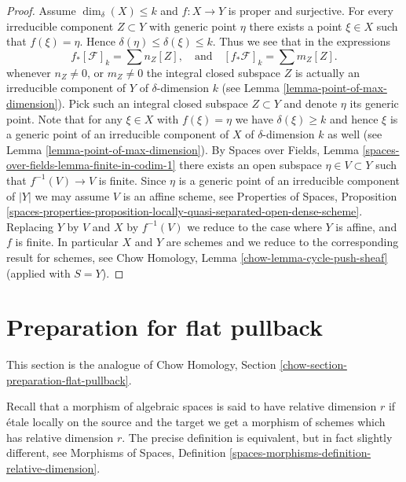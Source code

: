 \begin{proof}
\medskip\noindent
Assume $\dim_\delta(X) \leq k$ and $f : X \to Y$ is proper and surjective.
For every irreducible component $Z \subset Y$
with generic point $\eta$ there exists a point $\xi \in X$ such
that $f(\xi) = \eta$. Hence $\delta(\eta) \leq \delta(\xi) \leq k$.
Thus we see that in the expressions
$$
f_*[\mathcal{F}]_k = \sum n_Z[Z],
\quad
\text{and}
\quad
[f_*\mathcal{F}]_k = \sum m_Z[Z].
$$
whenever $n_Z \not = 0$, or $m_Z \not = 0$ the integral closed
subspace $Z$ is actually an irreducible component of $Y$ of
$\delta$-dimension $k$ (see Lemma \ref{lemma-point-of-max-dimension}).
Pick such an integral closed subspace $Z \subset Y$ and denote $\eta$
its generic point.
Note that for any $\xi \in X$ with $f(\xi) = \eta$ we have $\delta(\xi) \geq k$
and hence $\xi$ is a generic point of an irreducible component
of $X$ of $\delta$-dimension $k$ as well
(see Lemma \ref{lemma-point-of-max-dimension}).
By Spaces over Fields, Lemma \ref{spaces-over-fields-lemma-finite-in-codim-1}
there exists an open subspace $\eta \in V \subset Y$
such that $f^{-1}(V) \to V$ is finite.
Since $\eta$ is a generic point of an irreducible component of
$|Y|$ we may assume $V$ is an affine scheme, see
Properties of Spaces, Proposition
\ref{spaces-properties-proposition-locally-quasi-separated-open-dense-scheme}.
Replacing $Y$ by $V$ and $X$ by $f^{-1}(V)$ we reduce to the
case where $Y$ is affine, and $f$ is finite.
In particular $X$ and $Y$ are schemes and we reduce to
the corresponding result for schemes, see
Chow Homology, Lemma \ref{chow-lemma-cycle-push-sheaf}
(applied with $S = Y$).
\end{proof}













\section{Preparation for flat pullback}
\label{section-preparation-flat-pullback}

\noindent
This section is the analogue of
Chow Homology, Section \ref{chow-section-preparation-flat-pullback}.

\medskip\noindent
Recall that a morphism of algebraic spaces is said to have
relative dimension $r$ if \'etale locally on the source
and the target we get a morphism of schemes which has relative dimension $r$.
The precise definition is equivalent, but in fact slightly different, see
Morphisms of Spaces, Definition
\ref{spaces-morphisms-definition-relative-dimension}.


